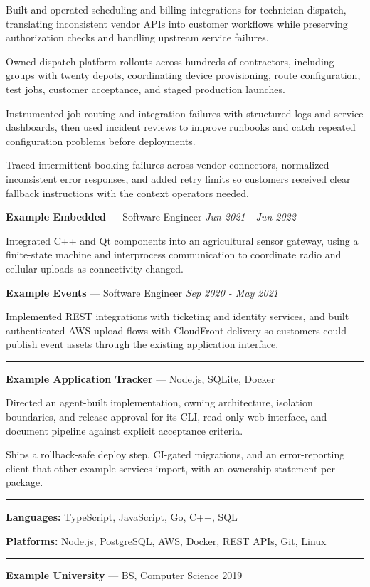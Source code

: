 \documentclass[10pt,letterpaper]{article}
\newcommand{\jtsection}[1]{\par\vspace{5pt}{\fontsize{11.5pt}{13pt}\selectfont\bfseries #1}\par\nobreak\vspace{1.5pt}\hrule\vspace{3pt}\nobreak}
\newenvironment{jtitems}
  {\begin{list}{\textbullet}{\setlength{\leftmargin}{12pt}\setlength{\labelwidth}{6pt}\setlength{\labelsep}{6pt}\setlength{\itemsep}{1pt}\setlength{\parsep}{0pt}\setlength{\topsep}{2pt}\setlength{\partopsep}{0pt}}}
  {\end{list}}
\begin{document}
\begin{jtitems}
\item Built and operated scheduling and billing integrations for technician dispatch, translating inconsistent vendor APIs into customer workflows while preserving authorization checks and handling upstream service failures.
\item Owned dispatch-platform rollouts across hundreds of contractors, including groups with twenty depots, coordinating device provisioning, route configuration, test jobs, customer acceptance, and staged production launches.
\item Instrumented job routing and integration failures with structured logs and service dashboards, then used incident reviews to improve runbooks and catch repeated configuration problems before deployments.
\item Traced intermittent booking failures across vendor connectors, normalized inconsistent error responses, and added retry limits so customers received clear fallback instructions with the context operators needed.
\end{jtitems}
\vspace{2pt}
\textbf{Example Embedded} --- Software Engineer \textperiodcentered{} \textit{Jun 2021 - Jun 2022}\par\nopagebreak[3]
\begin{jtitems}
\item Integrated C++ and Qt components into an agricultural sensor gateway, using a finite-state machine and interprocess communication to coordinate radio and cellular uploads as connectivity changed.
\end{jtitems}
\vspace{2pt}
\textbf{Example Events} --- Software Engineer \textperiodcentered{} \textit{Sep 2020 - May 2021}\par\nopagebreak[3]
\begin{jtitems}
\item Implemented REST integrations with ticketing and identity services, and built authenticated AWS upload flows with CloudFront delivery so customers could publish event assets through the existing application interface.
\end{jtitems}
\jtsection{Projects}
\textbf{Example Application Tracker} --- Node.js, SQLite, Docker\par\nopagebreak[3]
\begin{jtitems}
\item Directed an agent-built implementation, owning architecture, isolation boundaries, and release approval for its CLI, read-only web interface, and document pipeline against explicit acceptance criteria.
\item Ships a rollback-safe deploy step, CI-gated migrations, and an error-reporting client that other example services import, with an ownership statement per package.
\end{jtitems}
\jtsection{Technical Skills}
\textbf{Languages:} TypeScript, JavaScript, Go, C++, SQL\par
\textbf{Platforms:} Node.js, PostgreSQL, AWS, Docker, REST APIs, Git, Linux\par
\jtsection{Education}
\textbf{Example University} --- BS, Computer Science \textperiodcentered{} 2019\par
\end{document}
